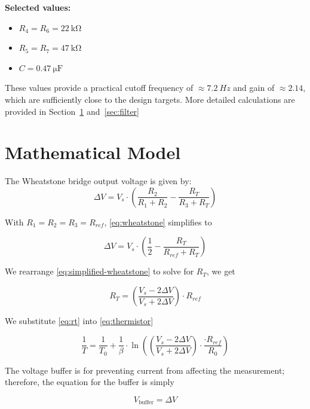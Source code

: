 \documentclass[12pt,a4paper]{article}
\begin{document}
\textbf{Selected values:}
\begin{itemize}
    \item $R_4 = R_6 = \SI{22}{\kilo\ohm}$
    \item $R_5 = R_7 = \SI{47}{\kilo\ohm}$
    \item $C = \SI{0.47}{\micro\farad}$
\end{itemize}

These values provide a practical cutoff frequency of $\approx \SI{7.2}{Hz}$ and gain of $\approx 2.14$, which are sufficiently close to the design targets. More detailed calculations are provided in Section~\ref{sec:math-model} and~\ref{sec:filter}

\section{Mathematical Model}
\label{sec:math-model}
The Wheatstone bridge output voltage is given by:
\begin{equation}
    \Delta V = V_s \cdot \left( \frac{R_2}{R_1 + R_2} - \frac{R_T}{R_3 + R_T} \right)
    \label{eq:wheatstone}
\end{equation}

With $R_1=R_2=R_3=R_{ref}$, \eqref{eq:wheatstone} simplifies to

\begin{equation}
    \Delta V = V_s \cdot \left(\frac{1}{2} - \frac{R_T}{R_{ref} + R_T} \right)
    \label{eq:simplified-wheatstone}
\end{equation}

We rearrange \eqref{eq:simplified-wheatstone} to solve for $R_T$, we get

\begin{equation}
    R_T = \left(\frac{V_s - 2\Delta V}{V_s + 2\Delta V}\right) \cdot R_{ref}
    \label{eq:rt}
\end{equation}

We substitute \eqref{eq:rt} into \eqref{eq:thermistor}

\begin{equation}
    \label{eq:t-to-v}
    \frac{1}{T} = \frac{1}{T_0} + \frac{1}{\beta} \cdot \ln{\left( \left(\frac{V_s - 2\Delta V}{V_s + 2\Delta V}\right) \cdot \frac{ \cdot R_{ref}}{R_0}\right)}
\end{equation}

The voltage buffer is for preventing current from affecting the measurement; therefore, the equation for the buffer is simply

\begin{equation}
    \label{eq:vbuf-to-deltav}
    V_\text{buffer} = \Delta V
\end{equation}
\end{document}
